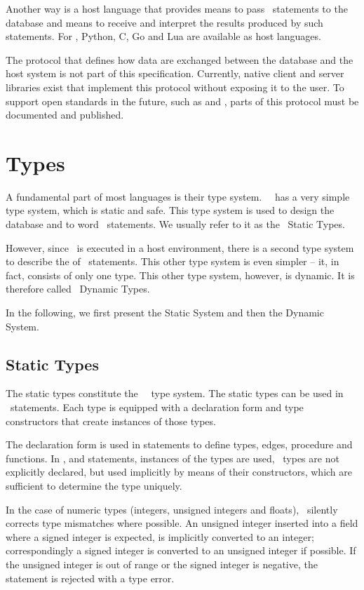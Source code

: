 Another way is a host language
that provides means to pass \sql\ statements
to the database and means to receive
and interpret the results produced by such statements.
For \nowdb, Python, C, Go and Lua
are available as host languages.

The protocol that defines how data are exchanged
between the database and the host system
is not part of this specification.
Currently, native client and server libraries
exist that implement this protocol
without exposing it to the user.
To support open standards in the future, such as
 and ,
parts of this protocol must be documented
and published.

\section{Types}
A fundamental part of most languages
is their type system. \nowdb\ \sql\
has a very simple type system,
which is static and safe.
This type system is used to design
the database and to word
\sql\ statements.
We usually refer to it as the \sql\ Static Types.

However, since \sql\ is executed
in a host environment, there is a second
type system to describe the 
of \sql\ statements.
This other type system is even simpler --
it, in fact, consists of only one type.
This other type system, however, is dynamic.
It is therefore called \sql\ Dynamic Types.

In the following, we first present
the Static System and then the Dynamic System.

\subsection{Static Types}
The static types constitute the \nowdb\ \sql\ type system.
The static types can be used in \sql\ statements.
Each type is equipped with a declaration form and
type constructors that create instances of those types.

The declaration form is used in  statements
to define types, edges, procedure and functions.
In ,  and  statements,
instances of the types are used, \ie\
types are not explicitly declared, but used implicitly
by means of their constructors, which are sufficient
to determine the type uniquely.

In the case of numeric types
(integers, unsigned integers and floats),
\nowdb\ silently corrects type mismatches where possible.
An unsigned integer inserted into a field where
a signed integer is expected, is implicitly converted
to an integer; correspondingly a signed integer
is converted to an unsigned integer if possible.
If the unsigned integer is out of range or
the signed integer is negative, the statement
is rejected with a type error.

